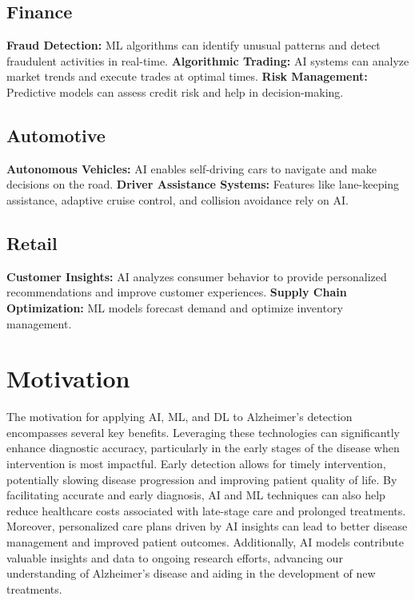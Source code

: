 \documentclass[a4paper,12pt]{report}
\begin{document}
    \subsection{Finance}
   
        \textbf{Fraud Detection:} ML algorithms can identify unusual patterns and detect fraudulent activities in real-time.
        \newline \textbf{Algorithmic Trading:} AI systems can analyze market trends and execute trades at optimal times.
        \newline \textbf{Risk Management:} Predictive models can assess credit risk and help in decision-making.
    
    \subsection{Automotive}
       \textbf{Autonomous Vehicles:} AI enables self-driving cars to navigate and make decisions on the road.
        \newline \textbf{Driver Assistance Systems:} Features like lane-keeping assistance, adaptive cruise control, and collision avoidance rely on AI.
    
    \subsection{Retail}
         \textbf{Customer Insights:} AI analyzes consumer behavior to provide personalized recommendations and improve customer experiences.
        \newline\textbf{Supply Chain Optimization:} ML models forecast demand and optimize inventory management.
    
    \section{Motivation}
    The motivation for applying AI, ML, and DL to Alzheimer’s detection encompasses several key benefits. Leveraging these technologies can significantly enhance diagnostic accuracy, particularly in the early stages of the disease when intervention is most impactful. Early detection allows for timely intervention, potentially slowing disease progression and improving patient quality of life. By facilitating accurate and early diagnosis, AI and ML techniques can also help reduce healthcare costs associated with late-stage care and prolonged treatments. Moreover, personalized care plans driven by AI insights can lead to better disease management and improved patient outcomes. Additionally, AI models contribute valuable insights and data to ongoing research efforts, advancing our understanding of Alzheimer’s disease and aiding in the development of new treatments.
\end{document}
